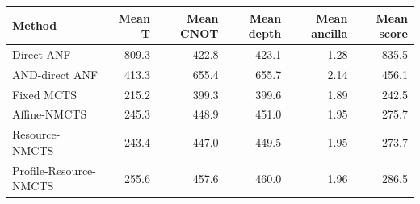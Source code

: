 \begin{tabular}{lrrrrr}
\toprule
Method & Mean T & Mean CNOT & Mean depth & Mean ancilla & Mean score \\
\midrule
Direct ANF & 809.3 & 422.8 & 423.1 & 1.28 & 835.5 \\
AND-direct ANF & 413.3 & 655.4 & 655.7 & 2.14 & 456.1 \\
Fixed MCTS & 215.2 & 399.3 & 399.6 & 1.89 & 242.5 \\
Affine-NMCTS & 245.3 & 448.9 & 451.0 & 1.95 & 275.7 \\
Resource-NMCTS & 243.4 & 447.0 & 449.5 & 1.95 & 273.7 \\
Profile-Resource-NMCTS & 255.6 & 457.6 & 460.0 & 1.96 & 286.5 \\
\bottomrule
\end{tabular}
